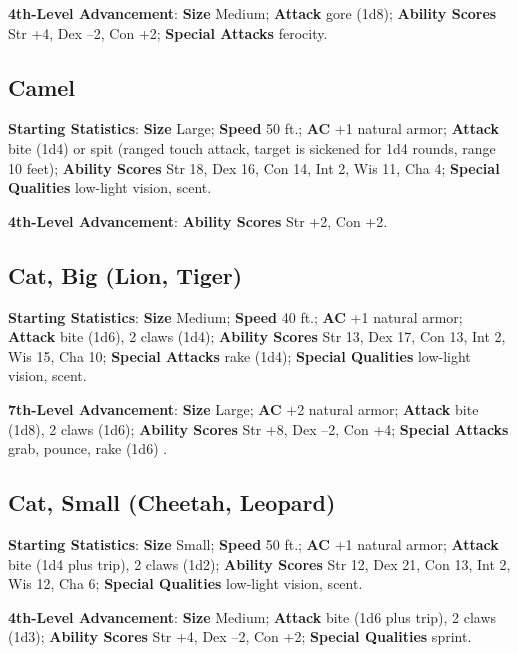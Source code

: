 \textbf{4th-Level Advancement}: \textbf{Size }Medium; \textbf{Attack} gore (1d8); \textbf{Ability Scores }Str +4, Dex --2, Con +2; \textbf{Special Attacks} ferocity. 
				
\subsection{Camel}

				
\textbf{Starting Statistics}:\textbf{ Size} Large; \textbf{Speed} 50 ft.; \textbf{AC} +1 natural armor; \textbf{Attack} bite (1d4) or spit (ranged touch attack, target is sickened for 1d4 rounds, range 10 feet); \textbf{Ability Scores }Str 18, Dex 16, Con 14, Int 2, Wis 11, Cha 4; \textbf{Special Qualities} low-light vision, scent.
				
\textbf{4th-Level Advancement}: \textbf{Ability Scores }Str +2, Con +2.
				
\subsection{Cat, Big (Lion, Tiger)}

				
\textbf{Starting Statistics}:\textbf{ Size} Medium; \textbf{Speed} 40 ft.; \textbf{AC} +1 natural armor; \textbf{Attack} bite (1d6), 2 claws (1d4); \textbf{Ability Scores }Str 13, Dex 17, Con 13, Int 2, Wis 15, Cha 10; \textbf{Special Attacks }rake (1d4); \textbf{Special Qualities} low-light vision, scent.
				
\textbf{7th-Level Advancement}: \textbf{Size }Large; \textbf{AC }+2 natural armor; \textbf{Attack} bite (1d8), 2 claws (1d6); \textbf{Ability Scores }Str +8, Dex --2, Con +4; \textbf{Special Attacks} grab, pounce, rake (1d6)  .
				
\subsection{Cat, Small (Cheetah, Leopard)}

				
\textbf{Starting Statistics}:\textbf{ Size} Small; \textbf{Speed} 50 ft.; \textbf{AC} +1 natural armor; \textbf{Attack} bite (1d4 plus trip), 2 claws (1d2); \textbf{Ability Scores }Str 12, Dex 21, Con 13, Int 2, Wis 12, Cha 6; \textbf{Special Qualities} low-light vision, scent.
				
\textbf{4th-Level Advancement}: \textbf{Size }Medium; \textbf{Attack} bite (1d6 plus trip), 2 claws (1d3); \textbf{Ability Scores }Str +4, Dex --2, Con +2; \textbf{Special Qualities} sprint. 
				
